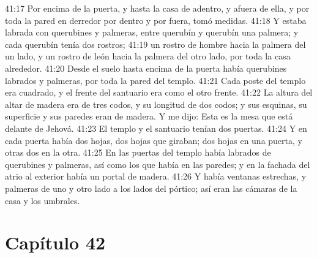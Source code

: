 41:17 Por encima de la puerta, y hasta la casa de adentro, y afuera de ella, y por toda la pared en derredor por dentro y por fuera, tomó medidas.   
41:18 Y estaba labrada con querubines y palmeras, entre querubín y querubín una palmera; y cada querubín tenía dos rostros;   
41:19 un rostro de hombre hacia la palmera del un lado, y un rostro de león hacia la palmera del otro lado, por toda la casa alrededor.   
41:20 Desde el suelo hasta encima de la puerta había querubines labrados y palmeras, por toda la pared del templo.   
41:21 Cada poste del templo era cuadrado, y el frente del santuario era como el otro frente.   
41:22 La altura del altar de madera era de tres codos, y su longitud de dos codos; y sus esquinas, su superficie y sus paredes eran de madera. Y me dijo: Esta es la mesa que está delante de Jehová.   
41:23 El templo y el santuario tenían dos puertas.   
41:24 Y en cada puerta había dos hojas, dos hojas que giraban; dos hojas en una puerta, y otras dos en la otra.   
41:25 En las puertas del templo había labrados de querubines y palmeras, así como los que había en las paredes; y en la fachada del atrio al exterior había un portal de madera.   
41:26 Y había ventanas estrechas, y palmeras de uno y otro lado a los lados del pórtico; así eran las cámaras de la casa y los umbrales.   
\section*{Capítulo 42 } 
  
